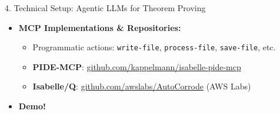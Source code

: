 \documentclass[compress,10pt,xcolor=dvipsnames]{beamer}
\begin{document}
\begin{frame}{4. Technical Setup: Agentic LLMs for Theorem Proving}
\begin{itemize}
  \item<3-> \textbf{MCP Implementations \& Repositories:}
    \begin{itemize}
      \item Programmatic actions: \texttt{write-file}, \texttt{process-file}, \texttt{save-file}, etc.
      \item \textbf{PIDE-MCP}: \href{https://github.com/kappelmann/isabelle-pide-mcp}{\textcolor{awesome}{github.com/kappelmann/isabelle-pide-mcp}}
      \item \textbf{Isabelle/Q}: \href{https://github.com/awslabs/AutoCorrode}{\textcolor{awesome}{github.com/awslabs/AutoCorrode}} (AWS Labs)
    \end{itemize}
  \vspace{0.3em}
  \item<4-> \textbf{Demo!}
\end{itemize}
\end{frame}
\end{document}
